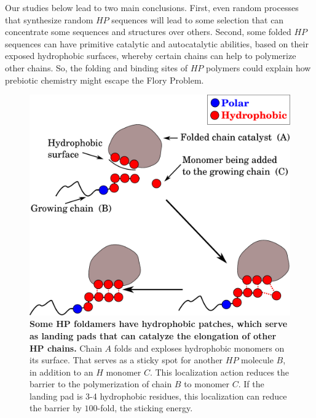 \documentclass[journal=jacsat,manuscript=article,layout=twocolumn]{achemso}
\begin{document}
Our studies 
below lead to two main conclusions.  First, even random processes that synthesize random $HP$ 
sequences will lead to some selection that can concentrate some sequences and structures over 
others.  Second, some folded $HP$ sequences can have primitive catalytic and autocatalytic 
abilities, based on their exposed hydrophobic surfaces, whereby certain chains can help to 
polymerize other chains.  So, the folding and binding sites of $HP$ polymers could explain how 
prebiotic chemistry might escape the Flory Problem.
   
   \begin{figure}[h!]
  \centering
  \includegraphics[width=0.9\columnwidth]{pictures/hp-catalysis.pdf} 
  \caption{\footnotesize{\textbf{Some HP foldamers have hydrophobic patches, which serve as 
landing pads that can catalyze the elongation of other HP chains.}  Chain $A$ folds and exploses 
hydrophobic monomers on its surface.
 That serves as a sticky spot for another $HP$ molecule $B$, in addition to an $H$ monomer $C$.  
This localization action reduces the barrier to the polymerization of chain $B$ to monomer $C$.  If the landing pad is 3-4 hydrophobic residues, this localization can reduce the barrier by $100$-fold, the sticking energy.}}
  \label{fig:hp-catalysis}
\end{figure} 
\end{document}
